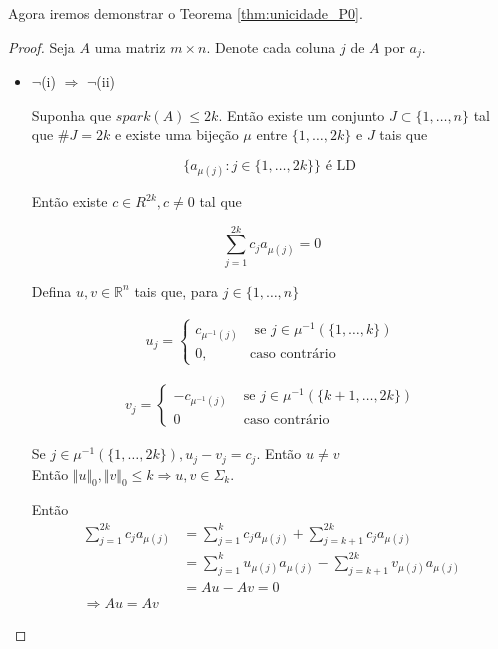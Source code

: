 Agora iremos demonstrar o Teorema \ref{thm:unicidade_P0}.
\begin{proof}
Seja $A$ uma matriz $m \times n$. Denote cada coluna $j$ de $A$ por $a_j$.
\begin{itemize}
\item $\neg$(i) $\Rightarrow$ $\neg$(ii)

Suponha que $\textit{spark}(A) \leq 2k$. Então existe um conjunto $J \subset \lbrace 1, \hdots, n \rbrace$  tal que $\#J = 2k$ e existe uma bijeção $\mu$ entre $\lbrace 1, \hdots, 2k \rbrace$ e $J$ tais que

$$ \lbrace a_{\mu(j)} : j \in \lbrace 1, \hdots, 2k \rbrace \rbrace \text{ é LD }$$

Então existe $c \in R^{2k}, c \neq 0$ tal que

$$ \sum_{j = 1}^{2k} c_j a_{\mu(j)} = 0$$

Defina $u, v \in \mathbb{R}^n$ tais que, para $j \in \lbrace 1, \hdots, n \rbrace$

\begin{subequations}
\begin{align*}
u_j = 
\begin{cases}
c_{\mu^{-1}(j)} & \text{ se } j \in \mu^{-1}(\lbrace 1, \hdots, k \rbrace) \\
0, & \text{caso contrário}
\end{cases}
\end{align*}
\end{subequations}

\begin{subequations}
\begin{align*}
v_j = \begin{cases}
 -c_{\mu^{-1}(j)} & \text{ se } j \in \mu^{-1}(\lbrace k+1, \hdots, 2k \rbrace)\\
  0 &\text{ caso contrário}
\end{cases}
\end{align*}
\end{subequations}


Se $j \in \mu^{-1}(\lbrace 1, \hdots, 2k \rbrace), u_j - v_j = c_j$. Então $u \neq v$\\
Então $\Vert u \Vert_0, \Vert v \Vert_0 \leq k \Rightarrow u, v \in \Sigma_k$.

Então
\begin{subequations}
\begin{align*}
\sum_{j = 1}^{2k} c_j a_{\mu(j)} &= \sum_{j = 1}^{k} c_j a_{\mu(j)} + \sum_{j = k+1}^{2k} c_j a_{\mu(j)}\\
& = \sum_{j = 1}^{k} u_{\mu(j)} a_{\mu(j)} - \sum_{j = k+1}^{2k} v_{\mu(j)} a_{\mu(j)} \\
& = Au - Av = 0 \\
 \Rightarrow Au = Av
\end{align*}
\end{subequations}


\end{itemize}
\end{proof}
